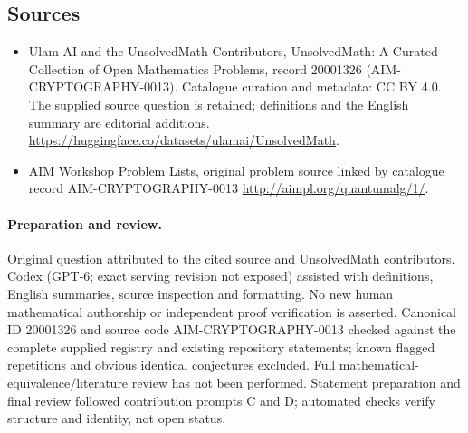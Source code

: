 \documentclass[11pt]{article}
\begin{document}
\subsection{Sources}
\begin{itemize}
\item[\hypertarget{source:20001326:1}{S1}] Ulam AI and the UnsolvedMath Contributors, UnsolvedMath: A Curated Collection of Open Mathematics Problems, record 20001326 (AIM-CRYPTOGRAPHY-0013). Catalogue curation and metadata: CC BY 4.0. The supplied source question is retained; definitions and the English summary are editorial additions.
\url{https://huggingface.co/datasets/ulamai/UnsolvedMath}.
\item[\hypertarget{source:20001326:2}{S2}] AIM Workshop Problem Lists, original problem source linked by catalogue record AIM-CRYPTOGRAPHY-0013
\url{http://aimpl.org/quantumalg/1/}.
\end{itemize}
\paragraph{Preparation and review.}
Original question attributed to the cited source and UnsolvedMath contributors. Codex (GPT-6; exact serving revision not exposed) assisted with definitions, English summaries, source inspection and formatting. No new human mathematical authorship or independent proof verification is asserted. Canonical ID 20001326 and source code AIM-CRYPTOGRAPHY-0013 checked against the complete supplied registry and existing repository statements; known flagged repetitions and obvious identical conjectures excluded. Full mathematical-equivalence/literature review has not been performed. Statement preparation and final review followed contribution prompts C and D; automated checks verify structure and identity, not open status.
\label{end:20001326}
\end{document}
